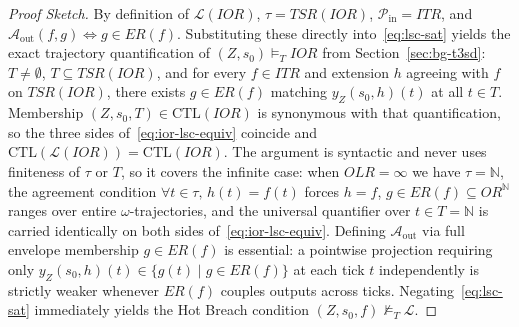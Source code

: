 \begin{proof}[Proof Sketch]
By definition of $\mathcal{L}(IOR)$, $\tau = TSR(IOR)$, $\mathcal{P}_{\text{in}} = ITR$, and $\mathcal{A}_{\text{out}}(f, g) \iff g \in ER(f)$.  Substituting these directly into~\eqref{eq:lsc-sat} yields the exact trajectory quantification of $(Z, s_0) \models_T IOR$ from Section~\ref{sec:bg-t3sd}: $T \neq \emptyset$, $T \subseteq TSR(IOR)$, and for every $f \in ITR$ and extension $h$ agreeing with $f$ on $TSR(IOR)$, there exists $g \in ER(f)$ matching $y_Z(s_0, h)(t)$ at all $t \in T$.  Membership $(Z, s_0, T) \in \mathrm{CTL}(IOR)$ is synonymous with that quantification, so the three sides of~\eqref{eq:ior-lsc-equiv} coincide and $\mathrm{CTL}(\mathcal{L}(IOR)) = \mathrm{CTL}(IOR)$.  The argument is syntactic and never uses finiteness of $\tau$ or $T$, so it covers the infinite case: when $OLR = \infty$ we have $\tau = \mathbb{N}$, the agreement condition $\forall t \in \tau,\, h(t) = f(t)$ forces $h = f$, $g \in ER(f) \subseteq OR^{\mathbb{N}}$ ranges over entire $\omega$-trajectories, and the universal quantifier over $t \in T = \mathbb{N}$ is carried identically on both sides of~\eqref{eq:ior-lsc-equiv}.  Defining $\mathcal{A}_{\text{out}}$ via full envelope membership $g \in ER(f)$ is essential: a pointwise projection requiring only $y_Z(s_0, h)(t) \in \{g(t) \mid g \in ER(f)\}$ at each tick $t$ independently is strictly weaker whenever $ER(f)$ couples outputs across ticks.  Negating~\eqref{eq:lsc-sat} immediately yields the Hot Breach condition $(Z, s_0, f) \not\models_T \mathcal{L}$.
\end{proof}

